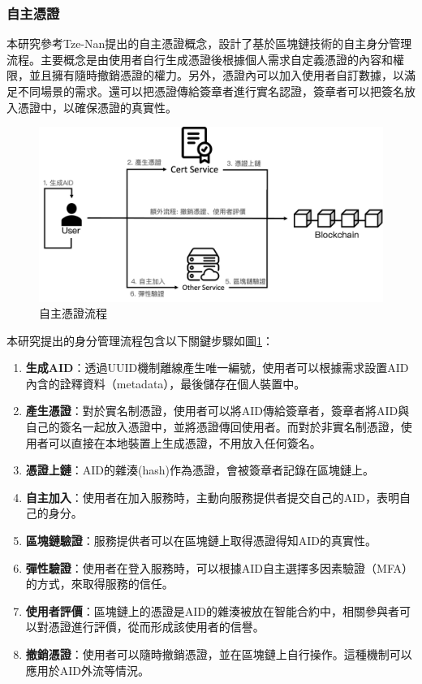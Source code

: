 \subsubsection{自主憑證}
本研究參考Tze-Nan\cite{NTU202102846}提出的自主憑證概念，設計了基於區塊鏈技術的自主身分管理流程。主要概念是由使用者自行生成憑證後根據個人需求自定義憑證的內容和權限，並且擁有隨時撤銷憑證的權力。另外，憑證內可以加入使用者自訂數據，以滿足不同場景的需求。還可以把憑證傳給簽章者進行實名認證，簽章者可以把簽名放入憑證中，以確保憑證的真實性。
\begin{figure}
  \centering
  \includegraphics[width=\linewidth,keepaspectratio]{figures/flow-sc.png}
  \caption{自主憑證流程}
  \label{fig:flow-sc}
\end{figure}
本研究提出的身分管理流程包含以下關鍵步驟如圖\ref{fig:flow-sc}：
\begin{enumerate}
  \item \textbf{生成AID}：透過UUID\cite{uuid}機制離線產生唯一編號，使用者可以根據需求設置AID內含的詮釋資料（metadata），最後儲存在個人裝置中。
  \item \textbf{產生憑證}：對於實名制憑證，使用者可以將AID傳給簽章者，簽章者將AID與自己的簽名一起放入憑證中，並將憑證傳回使用者。而對於非實名制憑證，使用者可以直接在本地裝置上生成憑證，不用放入任何簽名。
  \item \textbf{憑證上鏈}：AID的雜湊(hash)作為憑證，會被簽章者記錄在區塊鏈上。
  \item \textbf{自主加入}：使用者在加入服務時，主動向服務提供者提交自己的AID，表明自己的身分。
  \item \textbf{區塊鏈驗證}：服務提供者可以在區塊鏈上取得憑證得知AID的真實性。
  \item \textbf{彈性驗證}：使用者在登入服務時，可以根據AID自主選擇多因素驗證（MFA）的方式，來取得服務的信任。
  \item \textbf{使用者評價}：區塊鏈上的憑證是AID的雜湊被放在智能合約中，相關參與者可以對憑證進行評價，從而形成該使用者的信譽。
  \item \textbf{撤銷憑證}：使用者可以隨時撤銷憑證，並在區塊鏈上自行操作。這種機制可以應用於AID外流等情況。
\end{enumerate}
